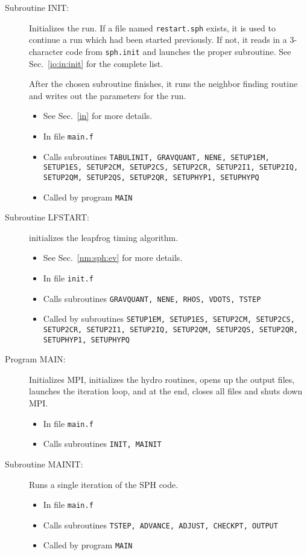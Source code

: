 \begin{description}
\item[Subroutine INIT:] Initializes the run.  If a file named {\tt restart.sph}
exists, it is used to continue a run which had been started previously.  
If not, it reads in a 3-character code from {\tt sph.init} and launches the
proper subroutine. See Sec.~\ref{io:in:init} for the complete list.

After the chosen subroutine
finishes, it runs the neighbor finding routine and writes out
the parameters for the run.
\begin{itemize} 
\item See Sec.~\ref{in} for more details.
\item In file {\tt main.f}
\item Calls subroutines {\tt TABULINIT, GRAVQUANT, NENE,
SETUP1EM, SETUP1ES, SETUP2CM, SETUP2CS, SETUP2CR, SETUP2I1,
SETUP2IQ, SETUP2QM, SETUP2QS, SETUP2QR, SETUPHYP1, SETUPHYPQ}
\item Called by program {\tt MAIN}
\end{itemize}

\item[Subroutine LFSTART:] initializes the leapfrog timing algorithm. 
\begin{itemize} 
\item See Sec.~\ref{nm:sph:ev} for more details.
\item In file {\tt init.f}
\item Calls subroutines {\tt GRAVQUANT, NENE, RHOS, VDOTS, TSTEP}
\item Called by subroutines {\tt SETUP1EM, SETUP1ES, SETUP2CM, SETUP2CS,
SETUP2CR, SETUP2I1, SETUP2IQ, SETUP2QM, SETUP2QS, SETUP2QR, SETUPHYP1, SETUPHYPQ}
\end{itemize}

\item[Program MAIN:] Initializes MPI, initializes the hydro
routines, opens up the output files, launches the iteration loop,
and at the end, closes all files and shuts down MPI.
\begin{itemize} 
\item In file {\tt main.f}
\item Calls subroutines {\tt INIT, MAINIT}
\end{itemize}

\item[Subroutine MAINIT:] Runs a single iteration of the SPH code.
\begin{itemize} 
\item In file {\tt main.f}
\item Calls subroutines {\tt TSTEP, ADVANCE, ADJUST, CHECKPT, OUTPUT}
\item Called by program {\tt MAIN}
\end{itemize}


\end{description}
